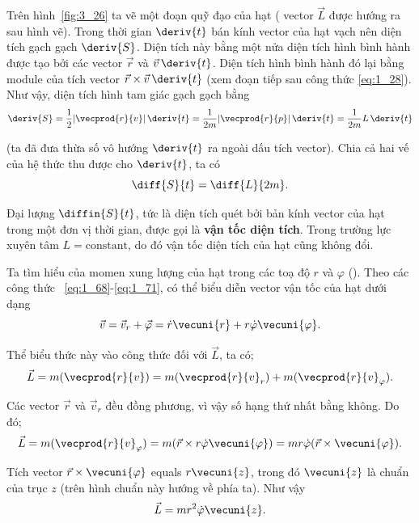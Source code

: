 Trên hình~\ref{fig:3_26} ta vẽ một đoạn quỹ đạo của hạt ( vector $\vec{L}$ được hướng ra sau hình vẽ). Trong thời gian $\deriv{t}$ bán kính vector của hạt vạch nên diện tích gạch gạch $\deriv{S}$. Diện tích này bằng một nửa diện tích hình bình hành được tạo bởi các vector $\vec{r}$ và $\vec{v}\,\deriv{t}$. Diện tích hình bình hành đó lại bằng module của tích vector $\vec{r}\times\vec{v}\,\deriv{t}$ (xem đoạn tiếp sau công thức \eqref{eq:1_28}). Như vậy, diện tích hình tam giác gạch gạch bằng
\begin{equation*}
\deriv{S} = \frac{1}{2}|\vecprod{r}{v}|\,\deriv{t} = \frac{1}{2m}|\vecprod{r}{p}|\,\deriv{t} = \frac{1}{2m}L\,\deriv{t}
\end{equation*}

\noindent
(ta đã đưa thừa số vô hướng $\deriv{t}$ ra ngoài dấu tích vector). Chia cả hai vế của hệ thức thu được cho $\deriv{t}$, ta có 
\begin{equation}\label{eq:3_121}
\diff{S}{t} = \diff{L}{2m}.
\end{equation}

Đại lượng $\diffin{S}{t}$, tức là diện tích quét bởi bản kính vector của hạt trong một đơn vị thời gian, được gọi là \textbf{vận tốc diện tích}. Trong trường lực xuyên tâm $L=\text{constant}$, do đó vận tốc diện tích của hạt cũng không đổi.

Ta tìm hiểu của momen xung lượng của hạt trong các toạ độ $r$ và $\varphi$ (). Theo các công thức ~\eqref{eq:1_68}-\eqref{eq:1_71}, có thể biểu diễn vector vận tốc của hạt dưới dạng 
\begin{equation}\label{eq:3_122}
\vec{v} = \vec{v}_r + \vec{\varphi} = \dot{r}\vecuni{r} + r\dot{\varphi}\vecuni{\varphi}.
\end{equation}

\noindent
Thể biểu thức này vào công thức đối với $\vec{L}$, ta có;
\begin{equation*}
\vec{L} = m(\vecprod{r}{v}) = m(\vecprod{r}{v}_r) + m(\vecprod{r}{v}_{\varphi}).
\end{equation*}

\noindent
Các vector $\vec{r}$ và $\vec{v}_r$ đều đồng phương, vì vậy số hạng thứ nhất bằng không. Do đó; 
\begin{equation*}
\vec{L} = m(\vecprod{r}{v}_{\varphi}) = m(\vec{r}\times r\dot{\varphi}\vecuni{\varphi}) = mr\dot{\varphi}(\vec{r}\times\vecuni{\varphi}).
\end{equation*}

\noindent
Tích vector $\vec{r}\times\vecuni{\varphi}$ equals $r\vecuni{z}$, trong đó $\vecuni{z}$ là chuẩn của trục $z$  (trên hình  chuẩn này hướng về phía ta). Như vậy 
\begin{equation}\label{eq:3_123}
\vec{L} = mr^2\dot{\varphi}\vecuni{z}.
\end{equation}

